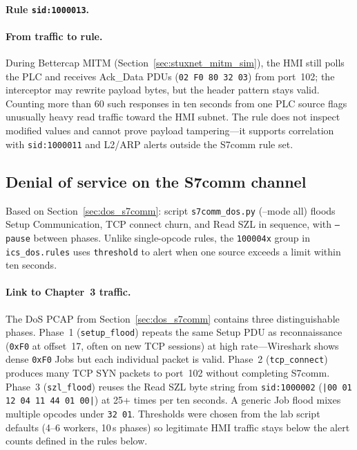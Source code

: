 \paragraph{Rule \texttt{sid:1000013}.}

\paragraph{From traffic to rule.}
During Bettercap MITM (Section~\ref{sec:stuxnet_mitm_sim}), the HMI still polls the PLC and receives Ack\_Data PDUs (\texttt{02 F0 80 32 03}) from port~102; the interceptor may rewrite payload bytes, but the header pattern stays valid. Counting more than 60 such responses in ten seconds from one PLC source flags unusually heavy read traffic toward the HMI subnet. The rule does not inspect modified values and cannot prove payload tampering---it supports correlation with \texttt{sid:1000011} and L2/ARP alerts outside the S7comm rule set.

\subsection{Denial of service on the S7comm channel}
\label{sec:rules-dos}

Based on Section~\ref{sec:dos_s7comm}: script \texttt{s7comm\_dos.py} (--mode all) floods Setup Communication, TCP connect churn, and Read SZL in sequence, with \texttt{--pause} between phases. Unlike single-opcode rules, the \texttt{100004x} group in \texttt{ics\_dos.rules} uses \texttt{threshold} to alert when one source exceeds a limit within ten seconds.

\paragraph{Link to Chapter~3 traffic.}
The DoS PCAP from Section~\ref{sec:dos_s7comm} contains three distinguishable phases. Phase~1 (\texttt{setup\_flood}) repeats the same Setup PDU as reconnaissance (\texttt{0xF0} at offset~17, often on new TCP sessions) at high rate---Wireshark shows dense \texttt{0xF0} Jobs but each individual packet is valid. Phase~2 (\texttt{tcp\_connect}) produces many TCP SYN packets to port~102 without completing S7comm. Phase~3 (\texttt{szl\_flood}) reuses the Read SZL byte string from \texttt{sid:1000002} (\texttt{|00 01 12 04 11 44 01 00|}) at 25+ times per ten seconds. A generic Job flood mixes multiple opcodes under \texttt{32 01}. Thresholds were chosen from the lab script defaults (4--6 workers, 10\,s phases) so legitimate HMI traffic stays below the alert counts defined in the rules below.


